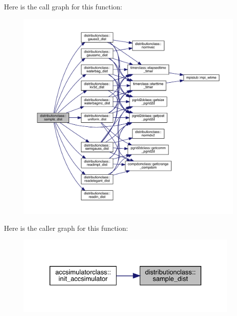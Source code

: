 Here is the call graph for this function\+:\nopagebreak
\begin{figure}[H]
\begin{center}
\leavevmode
\includegraphics[width=350pt]{namespacedistributionclass_a90036cb4aa43f5e3f9844bc412d2a766_cgraph}
\end{center}
\end{figure}
Here is the caller graph for this function\+:\nopagebreak
\begin{figure}[H]
\begin{center}
\leavevmode
\includegraphics[width=309pt]{namespacedistributionclass_a90036cb4aa43f5e3f9844bc412d2a766_icgraph}
\end{center}
\end{figure}
\mbox{\label{namespacedistributionclass_a0e031187f6b2818aebcd2911b93c0722}} 
